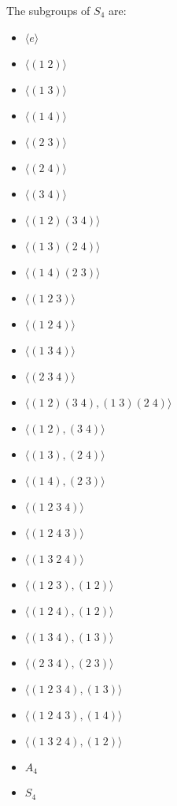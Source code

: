 \documentclass[12pt]{report}
\begin{document}
\sol The subgroups of $S_4$ are:
\begin{itemize}
    \item $\langle e \rangle$
    \item $\langle (1 \; 2) \rangle$
    \item $\langle(1 \; 3)\rangle$
    \item $\langle(1 \; 4)\rangle$
    \item $\langle(2 \; 3)\rangle$
    \item $\langle(2 \; 4)\rangle$
    \item $\langle(3 \; 4)\rangle$
    \item $\langle(1 \; 2)(3 \; 4)\rangle$
    \item $\langle(1 \; 3)(2 \; 4)\rangle$
    \item $\langle(1 \; 4)(2 \; 3)\rangle$
    \item $\langle (1 \; 2 \; 3)\rangle$
    \item $\langle (1 \; 2 \; 4)\rangle$
    \item $\langle (1 \; 3 \; 4)\rangle$
    \item $\langle (2 \; 3 \; 4)\rangle$
    \item $\langle(1 \; 2)(3 \; 4), (1 \; 3)(2 \; 4)\rangle$
    \item $\langle(1 \; 2), (3 \; 4)\rangle$
    \item $\langle(1 \; 3), (2 \; 4)\rangle$
    \item $\langle(1 \; 4), (2 \; 3)\rangle$
    \item $\langle(1 \; 2 \; 3 \; 4)\rangle$
    \item $\langle(1 \; 2 \; 4 \; 3)\rangle$
    \item $\langle(1 \; 3 \; 2 \; 4)\rangle$
    \item $\langle (1 \; 2 \; 3), (1 \; 2) \rangle$
    \item $\langle (1 \; 2 \; 4), (1 \; 2) \rangle$
    \item $\langle (1 \; 3 \; 4), (1 \; 3) \rangle$
    \item $\langle (2 \; 3 \; 4), (2 \; 3) \rangle$
    \item $\langle (1 \; 2 \; 3 \; 4), (1 \; 3) \rangle$
    \item $\langle (1 \; 2 \; 4 \; 3), (1 \; 4) \rangle$
    \item $\langle (1 \; 3 \; 2 \; 4), (1 \; 2) \rangle$
    \item $A_4$
    \item $S_4$
\end{itemize}
\end{document}
